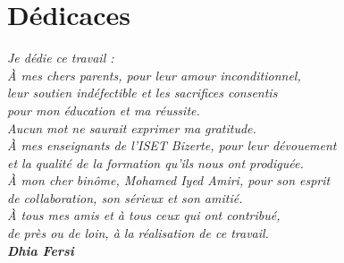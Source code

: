 
\thispagestyle{plain}
\chapter*{Dédicaces}

\begin{flushright}
    \itshape
    Je dédie ce travail : \\
    
    À mes chers parents, pour leur amour inconditionnel, \\
    leur soutien indéfectible et les sacrifices consentis \\
    pour mon éducation et ma réussite. \\
    Aucun mot ne saurait exprimer ma gratitude. \\
    
    À mes enseignants de l'ISET Bizerte, pour leur dévouement \\
    et la qualité de la formation qu'ils nous ont prodiguée. \\
    
    À mon cher binôme, Mohamed Iyed Amiri, pour son esprit \\
    de collaboration, son sérieux et son amitié. \\
    
    À tous mes amis et à tous ceux qui ont contribué, \\
    de près ou de loin, à la réalisation de ce travail. \\
    
    \vspace{1.5cm}
    \textbf{Dhia Fersi}
\end{flushright}

\newpage

\thispagestyle{plain}
